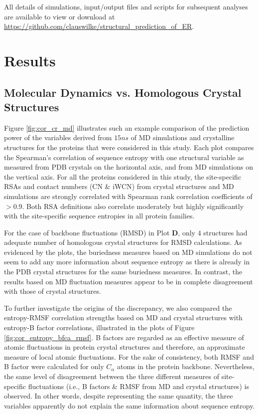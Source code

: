 \documentclass[12pt]{article}
\begin{document}
All details of simulations, input$/$output files and scripts for subsequent analyses are available to view or download at \url{https://github.com/clauswilke/structural\_prediction\_of\_ER}.

\section*{Results}

\subsection*{Molecular Dynamics vs. Homologous Crystal Structures}



Figure \ref{fig:cor_cr_md} illustrates such an example comparison of the prediction power of the variables derived from $15ns$ of MD simulations and crystalline structures for the proteins that were considered in this study. Each plot compares the Spearman's correlation of sequence entropy with one structural variable as measured from PDB crystals on the horizontal axis, and from MD simulations on the vertical axis. For all the proteins considered in this study, the site-specific RSAs and contact numbers (CN \& iWCN) from crystal structures and MD simulations are strongly correlated with Spearman rank correlation coefficients of $>0.9$. Both RSA definitions also correlate moderately but highly significantly with the site-specific sequence entropies in all protein families.

For the case of backbone fluctuations (RMSD) in Plot {\bf D}, only $4$ structures had adequate number of homologous crystal structures for RMSD calculations. As evidenced by the plots, the buriedness measures based on MD simulations do not seem to add any more information about sequence entropy as there is already in the PDB crystal structures for the same buriedness measures. In contrast, the results based on MD fluctuation measures appear to be in complete disagreement with those of crystal structures.

To further investigate the origins of the discrepancy, we also compared the entropy-RMSF correlation strengths based on MD and crystal structures with entropy-B factor correlations, illustrated in the plots of Figure \ref{fig:cor_entropy_bfca_rmsf}. B factors are regarded as an effective measure of atomic fluctuations in protein crystal structures and therefore, an approximate measure of local atomic fluctuations. For the sake of consistency, both RMSF and B factor were calculated for only $C_\alpha$ atoms in the protein backbone. Nevertheless, the same level of disagreement between the three different measures of site-specific fluctuations (i.e., B factors \& RMSF from MD and crystal structures) is observed. In other words, despite representing the same quantity, the three variables apparently do not explain the same information about sequence entropy.
\end{document}

